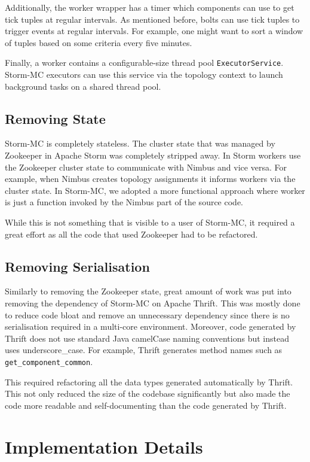 \documentclass[bsc,logo,frontabs,twoside,singlespacing,normalheadings,parskip]{infthesis}\usepackage[]{graphicx}\usepackage[]{color}
\begin{document}
Additionally, the worker wrapper has a timer which components can use to get tick tuples at regular intervals. As mentioned before, bolts can use tick tuples to trigger events at regular intervals. For example, one might want to sort a window of tuples based on some criteria every five minutes.

Finally, a worker contains a configurable-size thread pool \texttt{ExecutorService}. Storm-MC executors can use this service via the topology context to launch background tasks on a shared thread pool.

\subsection{Removing State}

Storm-MC is completely stateless. The cluster state that was managed by Zookeeper in Apache Storm was completely stripped away. In Storm workers use the Zookeeper cluster state to communicate with Nimbus and vice versa. For example, when Nimbus creates topology assignments it informs workers via the cluster state. In Storm-MC, we adopted a more functional approach where worker is just a function invoked by the Nimbus part of the source code.

While this is not something that is visible to a user of Storm-MC, it required a great effort as all the code that used Zookeeper had to be refactored.

\subsection{Removing Serialisation}

Similarly to removing the Zookeeper state, great amount of work was put into removing the dependency of Storm-MC on Apache Thrift. This was mostly done to reduce code bloat and remove an unnecessary dependency since there is no serialisation required in a multi-core environment. Moreover, code generated by Thrift does not use standard Java camelCase naming conventions but instead uses underscore\_case. For example, Thrift generates method names such as \\ \texttt{get\_component\_common}.

This required refactoring all the data types generated automatically by Thrift. This not only reduced the size of the codebase significantly but also made the code more readable and self-documenting than the code generated by Thrift.

\section{Implementation Details}
\label{sec:implementation}
\end{document}
